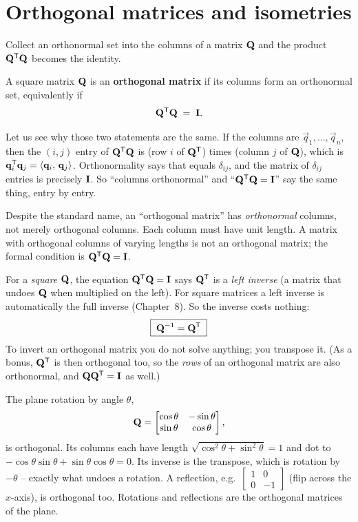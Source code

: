 \section{Orthogonal matrices and isometries}

Collect an orthonormal set into the columns of a matrix $\mathbf{Q}$ and the product $\mathbf{Q}^{\mathsf{T}}\mathbf{Q}$
becomes the identity.

\begin{definition}\label{ch17:def-orthogonal-matrix}
A square matrix $\mathbf{Q}$ is an \textbf{orthogonal matrix} if its columns form an orthonormal set,
equivalently if
\[
  \mathbf{Q}^{\mathsf{T}}\mathbf{Q} \;=\; \mathbf{I} .
\]
\end{definition}

Let us see why those two statements are the same. If the columns are $\vec q_1,\dots,\vec q_n$,
then the $(i,j)$ entry of $\mathbf{Q}^{\mathsf{T}}\mathbf{Q}$ is (row $i$ of $\mathbf{Q}^{\mathsf{T}}$) times (column $j$ of $\mathbf{Q}$),
which is $\mathbf{q}_i^{\mathsf{T}}\mathbf{q}_j=\langle \mathbf{q}_i,\, \mathbf{q}_j \rangle$. Orthonormality says that equals
$\delta_{ij}$, and the matrix of $\delta_{ij}$ entries is precisely $\mathbf{I}$. So
``columns orthonormal'' and ``$\mathbf{Q}^{\mathsf{T}}\mathbf{Q}=\mathbf{I}$'' say the same thing, entry by entry.

\begin{trapbox}
Despite the standard name, an ``orthogonal matrix'' has \emph{orthonormal} columns,
not merely orthogonal columns. Each column must have unit length. A matrix with
orthogonal columns of varying lengths is not an orthogonal matrix; the formal
condition is $\mathbf{Q}^{\mathsf{T}}\mathbf{Q} = \mathbf{I}$.
\end{trapbox}

For a \emph{square} $\mathbf{Q}$, the equation $\mathbf{Q}^{\mathsf{T}}\mathbf{Q}=\mathbf{I}$ says $\mathbf{Q}^{\mathsf{T}}$ is a
\emph{left inverse} (a matrix that undoes $\mathbf{Q}$ when multiplied on the left). For square
matrices a left inverse is automatically the full inverse (Chapter~8). So the inverse costs nothing:
\[
  \boxed{\;\mathbf{Q}^{-1} = \mathbf{Q}^{\mathsf{T}}\;}
\]
To invert an orthogonal matrix you do not solve anything; you transpose it. (As a bonus,
$\mathbf{Q}^{\mathsf{T}}$ is then orthogonal too, so the \emph{rows} of an orthogonal matrix are also orthonormal,
and $\mathbf{Q}\mathbf{Q}^{\mathsf{T}}=\mathbf{I}$ as well.)

\begin{example}\label{ch17:rotation-matrix}
The plane rotation by angle $\theta$,
\[
  \mathbf{Q}=\begin{bmatrix}\cos\theta & -\sin\theta\\ \sin\theta & \cos\theta\end{bmatrix},
\]
is orthogonal. Its columns each have length $\sqrt{\cos^2\theta+\sin^2\theta}=1$ and dot to
$-\cos\theta\sin\theta+\sin\theta\cos\theta=0$. Its inverse is the transpose, which is rotation by
$-\theta$ -- exactly what undoes a rotation. A reflection, e.g.\
$\begin{bmatrix}1&0\\0&-1\end{bmatrix}$ (flip across the $x$-axis), is orthogonal too. Rotations
and reflections are the orthogonal matrices of the plane.
\end{example}

